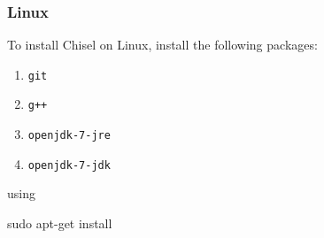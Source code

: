 \documentclass[twocolumn, 10pt]{article}
\begin{document}
\subsubsection{Linux}

To install Chisel on Linux, install the following packages:

\begin{enumerate}
\item \verb+git+
\item \verb|g++|
\item \verb+openjdk-7-jre+
\item \verb+openjdk-7-jdk+
\end{enumerate}

\noindent
using

\begin{bash}
sudo apt-get install
\end{bash}

% 
% 
\end{document}
